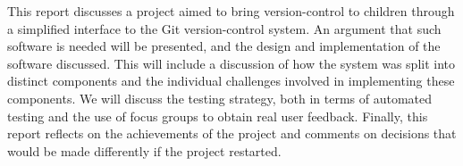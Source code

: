 This report discusses a project aimed to bring version-control to children through a simplified interface to the Git version-control system. An argument that such software is needed will be presented, and the design and implementation of the software discussed. This will include a discussion of how the system was split into distinct components and the individual challenges involved in implementing these components. We will discuss the testing strategy, both in terms of automated testing and the use of focus groups to obtain real user feedback. Finally, this report reflects on the achievements of the project and comments on decisions that would be made differently if the project restarted.